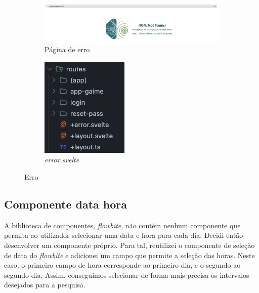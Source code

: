 \begin{figure}[!h]
	\centering
	\begin{subfigure}[c]{0.80\textwidth}
		\centering
		\includegraphics[width=\textwidth]{figs/404.png}
		\caption{Página de erro}
		\label{fig:404}
	\end{subfigure}
	\hfill
	\begin{subfigure}[c]{0.15\textwidth}
        \centering
        \includegraphics[width=\textwidth]{figs/errorRoute.png}
        \caption{\textit{error.svelte}}
        \label{fig:errorRoute}
	\end{subfigure}
	\caption{Erro}
\end{figure}

\subsection{Componente data hora} %
A biblioteca de componentes, \textit{flowbite}, não contém nenhum componente que permita ao utilizador selecionar uma data e hora para cada dia. Decidi então desenvolver um componente próprio. Para tal, reutilizei o componente de seleção de data do \textit{flowbite} e adicionei um campo que permite a seleção das horas. Neste caso, o primeiro campo de hora corresponde ao primeiro dia, e o segundo ao segundo dia. Assim, conseguimos selecionar de forma mais precisa os intervalos desejados para a pesquisa.

